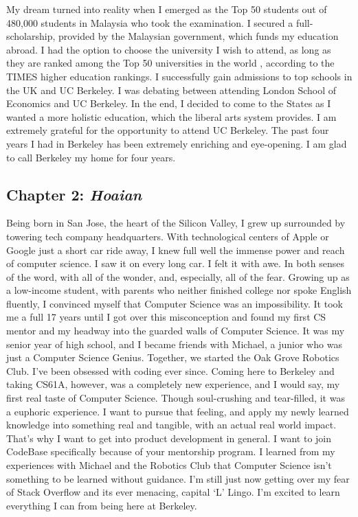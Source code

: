 \documentclass{article}
\begin{document}
My dream turned into reality when I emerged as the Top 50 students out of 480,000 students in Malaysia who took the examination. I secured a full-scholarship, provided by the Malaysian government, which funds my education abroad. I had the option to choose the university I wish to attend, as long as they are ranked among the Top 50 universities in the world , according to the TIMES higher education rankings. I successfully gain admissions to top schools in the UK and UC Berkeley. I was debating between attending London School of Economics and UC Berkeley. In the end, I decided to come to the States as I wanted a more holistic education, which the liberal arts system provides. I am extremely grateful for the opportunity to attend UC Berkeley. The past four years I had in Berkeley has been extremely enriching and eye-opening. I am glad to call Berkeley my home for four years. 


\subsection*{Chapter 2: \textit{Hoaian}}

Being born in San Jose, the heart of the Silicon Valley, I grew up surrounded by towering tech company headquarters. With technological centers of Apple or Google just a short car ride away, I knew full well  the immense power and reach of computer science. I saw it on every long car. I felt it with awe. In both senses of the word, with all of the wonder, and, especially, all of the fear. Growing up as a low-income student, with parents who neither finished college nor spoke English fluently, I convinced myself that Computer Science was an impossibility. It took me a full 17 years until I got over this misconception and found my first CS mentor and my headway into the guarded walls of Computer Science. It was my senior year of high school, and I became friends with Michael, a junior who was just a Computer Science Genius. Together, we started the Oak Grove Robotics Club. I’ve been obsessed with coding ever since. Coming here to Berkeley and taking CS61A, however, was a completely new experience, and I would say, my first real taste of Computer Science. Though soul-crushing and tear-filled, it was a euphoric experience. I want to pursue that feeling, and apply my newly learned knowledge into something real and tangible, with an actual real world impact. That’s why I want to get into product development in general. I want to join CodeBase specifically because of your mentorship program. I learned from my experiences with Michael and the Robotics Club that Computer Science isn’t something to be learned without guidance. I’m still just now getting over my fear of Stack Overflow and its ever menacing, capital ‘L’ Lingo. I'm excited to learn everything I can from being here at Berkeley.
\end{document}
